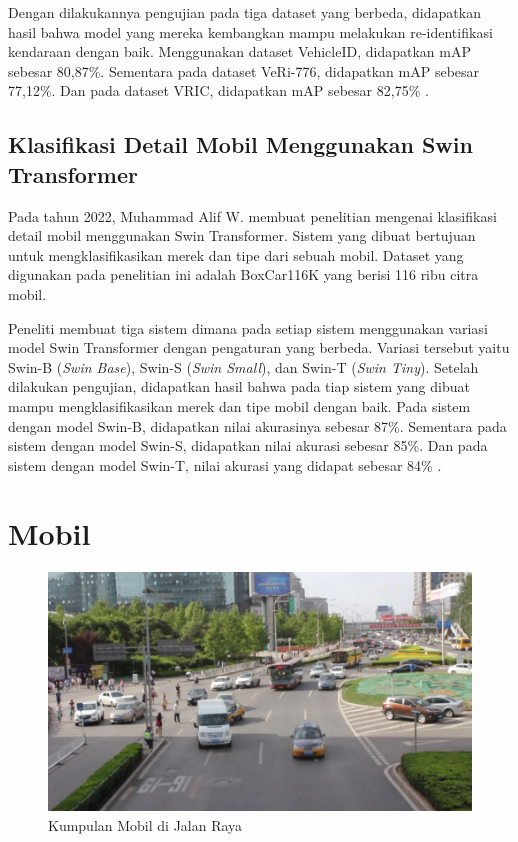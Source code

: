 Dengan dilakukannya pengujian pada tiga dataset yang berbeda, didapatkan hasil bahwa model yang mereka kembangkan 
mampu melakukan re-identifikasi kendaraan dengan baik. Menggunakan dataset VehicleID, didapatkan mAP sebesar 80,87\%. 
Sementara  pada dataset VeRi-776, didapatkan mAP sebesar 77,12\%. Dan pada dataset VRIC, didapatkan mAP sebesar 
82,75\% \parencite{Rong2021}.

\subsection{Klasifikasi Detail Mobil Menggunakan Swin Transformer}

Pada tahun 2022, Muhammad Alif W. membuat penelitian mengenai klasifikasi detail mobil menggunakan Swin Transformer. 
Sistem yang dibuat bertujuan untuk mengklasifikasikan merek dan tipe dari sebuah mobil. Dataset yang digunakan 
pada penelitian ini adalah BoxCar116K yang berisi 116 ribu citra mobil.

Peneliti membuat tiga sistem dimana pada setiap sistem menggunakan variasi model Swin Transformer dengan pengaturan 
yang berbeda. Variasi tersebut yaitu Swin-B (\emph{Swin Base}), Swin-S (\emph{Swin Small}), dan Swin-T (\emph{Swin Tiny}). 
Setelah dilakukan pengujian, didapatkan hasil bahwa pada tiap sistem yang dibuat mampu mengklasifikasikan merek 
dan tipe mobil dengan baik. Pada sistem dengan model Swin-B, didapatkan nilai akurasinya sebesar 87\%. 
Sementara pada sistem dengan model Swin-S, didapatkan nilai akurasi sebesar 85\%. Dan pada sistem dengan 
model Swin-T, nilai akurasi yang didapat sebesar 84\% \parencite{Wicaksono2022}.

\section{Mobil}
\label{sec:mobil}

\begin{figure}[ht]
  \centering
  \includegraphics[scale=0.35]{gambar/Mobil2.jpg}
  \caption{Kumpulan Mobil di Jalan Raya}
  \label{fig:kumpulanmobildijalanraya}
\end{figure}


